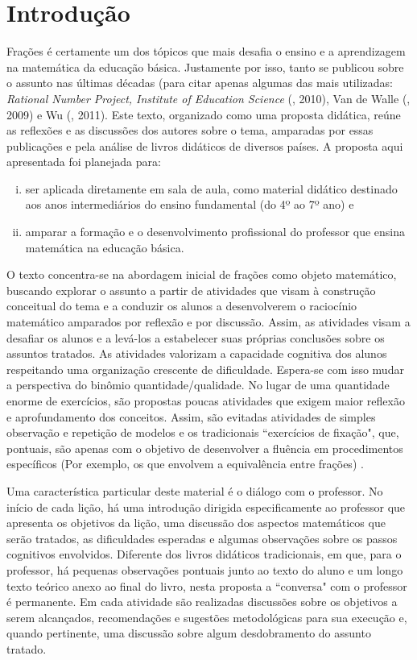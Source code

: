 
\setcounter{chapter}{-1}
\chapter{Introdução}


Frações é certamente um dos tópicos que mais desafia o ensino e a aprendizagem na matemática da educação básica. Justamente por isso, tanto se publicou sobre o assunto nas últimas décadas (para citar apenas algumas das mais utilizadas:  {\it Rational Number Project, Institute of Education Science} (\cite{IES}, 2010), Van de Walle (\cite{Walle}, 2009) e Wu (\cite{Wu}, 2011). Este texto, organizado como uma proposta didática,  reúne as reflexões e as discussões dos autores sobre o tema, amparadas por essas publicações e pela análise de livros didáticos de diversos países. A proposta aqui apresentada foi planejada para:

\begin{enumerate}[(i)]
\item  ser aplicada diretamente em sala de aula, como material didático destinado aos anos intermediários do ensino fundamental (do 4º ao 7º ano) e 
\item amparar a formação e o desenvolvimento profissional do professor que ensina matemática na educação básica.
\end{enumerate}

O texto concentra-se na abordagem inicial de frações como objeto matemático, buscando explorar o assunto a partir de atividades que visam à construção conceitual do tema e a conduzir os alunos a desenvolverem o raciocínio matemático amparados por reflexão e por discussão. Assim, as atividades visam a desafiar os alunos e a levá-los a estabelecer suas próprias conclusões sobre os assuntos tratados. As atividades valorizam a capacidade cognitiva dos alunos respeitando uma organização crescente de dificuldade. Espera-se com isso mudar a perspectiva do binômio quantidade/qualidade. No lugar de uma quantidade enorme de exercícios, são propostas poucas  atividades que exigem maior reflexão e aprofundamento dos conceitos. Assim, são evitadas atividades de simples observação e repetição de modelos e os tradicionais ``exercícios de fixação", que, pontuais, são apenas com o objetivo de desenvolver a fluência em procedimentos específicos (Por exemplo, os que envolvem a equivalência entre frações) . 

Uma característica particular deste material é o diálogo com o professor. No início de cada lição, há uma introdução dirigida especificamente ao professor que apresenta os objetivos da lição, uma discussão dos aspectos matemáticos que serão tratados, as dificuldades esperadas e algumas observações sobre os passos cognitivos envolvidos. Diferente dos livros didáticos tradicionais, em que, para o professor, há pequenas observações pontuais junto ao texto do aluno e um longo texto teórico anexo ao final do livro, nesta proposta a ``conversa" com o professor é permanente. Em cada atividade são realizadas discussões sobre os objetivos a serem alcançados, recomendações e sugestões metodológicas para sua execução e, quando pertinente, uma discussão sobre algum desdobramento do assunto tratado.

